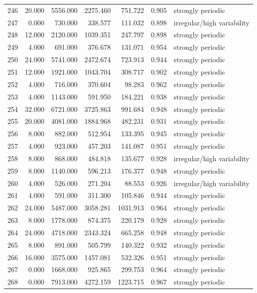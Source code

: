 \begin{longtable}{lrrrrrl}
246 & 20.000 & 5556.000 & 2275.460 & 751.722 & 0.905 & strongly periodic \\
247 & 0.000 & 730.000 & 338.577 & 111.032 & 0.898 & irregular/high variability \\
248 & 12.000 & 2120.000 & 1039.351 & 247.797 & 0.898 & strongly periodic \\
249 & 4.000 & 691.000 & 376.678 & 131.071 & 0.954 & strongly periodic \\
250 & 24.000 & 5741.000 & 2472.674 & 723.913 & 0.944 & strongly periodic \\
251 & 12.000 & 1921.000 & 1043.704 & 308.717 & 0.902 & strongly periodic \\
252 & 4.000 & 716.000 & 370.604 & 98.283 & 0.962 & strongly periodic \\
253 & 4.000 & 1143.000 & 591.950 & 184.221 & 0.938 & strongly periodic \\
254 & 32.000 & 6721.000 & 3725.863 & 991.684 & 0.948 & strongly periodic \\
255 & 20.000 & 4081.000 & 1884.968 & 482.231 & 0.931 & strongly periodic \\
256 & 8.000 & 882.000 & 512.954 & 133.395 & 0.945 & strongly periodic \\
257 & 4.000 & 923.000 & 457.203 & 141.087 & 0.951 & strongly periodic \\
258 & 8.000 & 868.000 & 484.818 & 135.677 & 0.928 & irregular/high variability \\
259 & 8.000 & 1140.000 & 596.213 & 176.377 & 0.948 & strongly periodic \\
260 & 4.000 & 526.000 & 271.204 & 88.553 & 0.926 & irregular/high variability \\
261 & 4.000 & 591.000 & 311.300 & 105.846 & 0.944 & strongly periodic \\
262 & 24.000 & 5487.000 & 3058.281 & 1031.913 & 0.964 & strongly periodic \\
263 & 8.000 & 1778.000 & 874.375 & 220.179 & 0.928 & strongly periodic \\
264 & 24.000 & 4718.000 & 2343.324 & 665.258 & 0.948 & strongly periodic \\
265 & 8.000 & 891.000 & 505.799 & 140.322 & 0.932 & strongly periodic \\
266 & 16.000 & 3575.000 & 1457.081 & 532.326 & 0.951 & strongly periodic \\
267 & 0.000 & 1668.000 & 925.865 & 299.753 & 0.964 & strongly periodic \\
268 & 0.000 & 7913.000 & 4272.159 & 1223.715 & 0.967 & strongly periodic \\

\end{longtable}
